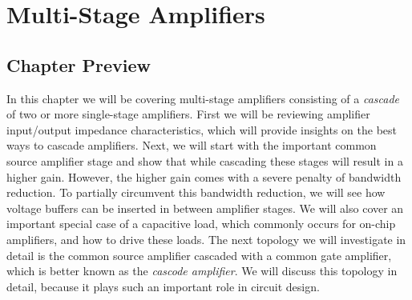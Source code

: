 \chapter{Multi-Stage Amplifiers}
\label{ch:ch15_multi_stage_amps}
\graphicspath{{./figures/figs_ch15_multistage/}}
\newcommand{\topicA}{Review Amplifier Input/Output Impedance Characteristics}
\newcommand{\topicB}{Common-Source Cascades}
\newcommand{\topicC}{Common-Source with Capacitive Load}
\newcommand{\topicD}{Common-Source Common-Gate Cascade (Cascode)}
\newcommand{\topicE}{"Big Circuit" Example}
\section{Chapter Preview}
In this chapter we will be covering multi-stage amplifiers consisting of a \textit{cascade} of two or more single-stage amplifiers.  First we will be reviewing amplifier input/output impedance characteristics, which will provide insights on the best ways to cascade amplifiers.  Next, we will start with the important common source amplifier stage and show that while cascading these stages will result in a higher gain.  However, the higher gain comes with a severe penalty of bandwidth reduction.  To partially circumvent this bandwidth reduction, we will see how voltage buffers can be inserted in between amplifier stages.  We will also cover an important special case of a capacitive load, which commonly occurs for on-chip amplifiers, and how to drive these loads.  The next topology we will investigate in detail is the common source amplifier cascaded with a common gate amplifier, which is better known as the \textit{cascode amplifier}.  We will discuss this topology in detail, because it plays such an important role in circuit design.


